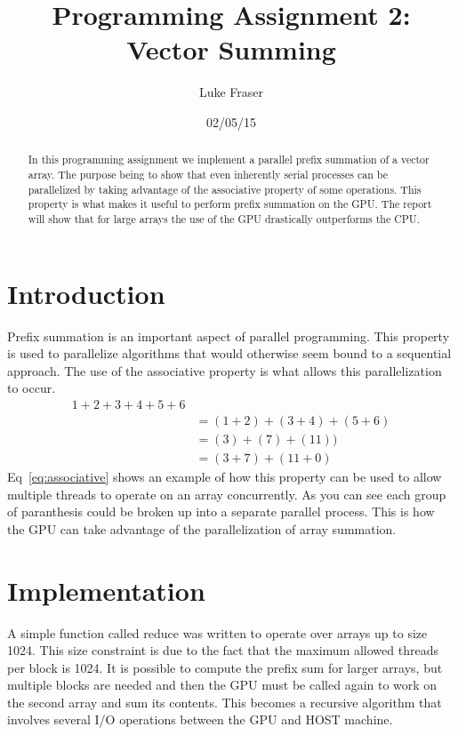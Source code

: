 \documentclass[letterpaper,twocolumn]{article}
\author{Luke Fraser}
\title{Programming Assignment 2: \\ Vector Summing}
\date{02/05/15}
\begin{document}
\maketitle
\begin{abstract}
  In this programming assignment we implement a parallel prefix summation of a vector array. The purpose being to show that even inherently serial processes can be parallelized by taking advantage of the associative property of some operations. This property is what makes it useful to perform prefix summation on the GPU. The report will show that for large arrays the use of the GPU drastically outperforms the CPU.
\end{abstract}

\section{Introduction}
Prefix summation is an important aspect of parallel programming. This property is used to parallelize algorithms that would otherwise seem bound to a sequential approach. The use of the associative property is what allows this parallelization to occur. 
\begin{equation}
\begin{split}
  1+2+3+4+5+6 \\ 
  &=(1+2)+(3+4)+(5+6) \\
  &=(3)+(7)+(11)) \\
  &=(3+7)+(11+0)
  \label{eq:associative}
\end{split}
\end{equation}
Eq~\ref{eq:associative} shows an example of how this property can be used to allow multiple threads to operate on an array concurrently. As you can see each group of paranthesis could be broken up into a separate parallel process. This is how the GPU can take advantage of the parallelization of array summation.

\section{Implementation}
A simple function called reduce was written to operate over arrays up to size 1024. This size constraint is due to the fact that the maximum allowed threads per block is 1024. It is possible to compute the prefix sum for larger arrays, but multiple blocks are needed and then the GPU must be called again to work on the second array and sum its contents. This becomes a recursive algorithm that involves several I/O operations between the GPU and HOST machine.
\end{document}
